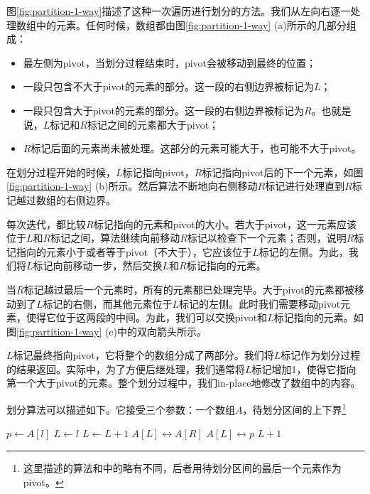 \documentclass[UTF8]{article}
\begin{document}
图\ref{fig:partition-1-way}描述了这种一次遍历进行划分的方法。我们从左向右逐一处理数组中的元素。任何时候，数组都由图\ref{fig:partition-1-way} (a)所示的几部分组成：

\begin{itemize}
\item 最左侧为pivot，当划分过程结束时，pivot会被移动到最终的位置；
\item 一段只包含不大于pivot的元素的部分。这一段的右侧边界被标记为$L$；
\item 一段只包含大于pivot的元素的部分。这一段的右侧边界被标记为$R$。也就是说，$L$标记和$R$标记之间的元素都大于pivot；
\item $R$标记后面的元素尚未被处理。这部分的元素可能大于，也可能不大于pivot。
\end{itemize}

在划分过程开始的时候，$L$标记指向pivot，$R$标记指向pivot后的下一个元素，如图\ref{fig:partition-1-way} (b)所示。然后算法不断地向右侧移动$R$标记进行处理直到$R$标记越过数组的右侧边界。

每次迭代，都比较$R$标记指向的元素和pivot的大小。若大于pivot，这一元素应该位于$L$和$R$标记之间，算法继续向前移动$R$标记以检查下一个元素；否则，说明$R$标记指向的元素小于或者等于pivot（不大于），它应该位于$L$标记的左侧。为此，我们将$L$标记向前移动一步，然后交换$L$和$R$标记指向的元素。

当$R$标记越过最后一个元素时，所有的元素都已处理完毕。大于pivot的元素都被移动到了$L$标记的右侧，而其他元素位于$L$标记的左侧。此时我们需要移动pivot元素，使得它位于这两段的中间。为此，我们可以交换pivot和$L$标记指向的元素。如图\ref{fig:partition-1-way} (c)中的双向箭头所示。

$L$标记最终指向pivot，它将整个的数组分成了两部分。我们将$L$标记作为划分过程的结果返回。实际中，为了方便后继处理，我们通常将$L$标记增加1，使得它指向第一个大于pivot的元素。整个划分过程中，我们in-place地修改了数组中的内容。

划分算法可以描述如下。它接受三个参数：一个数组$A$，待划分区间的上下界\footnote{这里描述的算法和\cite{CLRS}中的略有不同，后者用待划分区间的最后一个元素作为pivot。}

\begin{algorithmic}[1]
  \State $p \gets A[l]$  
  \State $L \gets l$ 
   
     
      \State $L \gets L + 1$
      \State {} $A[L] \leftrightarrow A[R]$
    \EndIf
  \EndFor
  \State {} $A[L] \leftrightarrow p$
  \State \Return $L + 1$ 
\EndFunction
\end{algorithmic}
\end{document}
